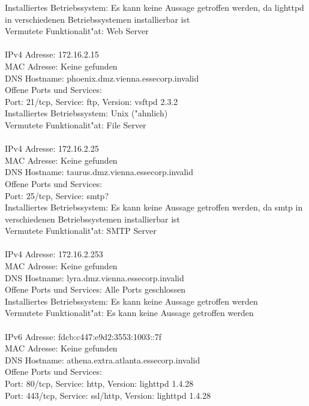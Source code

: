 \documentclass[12pt,a4paper,titlepage,oneside]{scrartcl}
\begin{document}
Installiertes Betriebssystem: Es kann keine Aussage getroffen werden, da lighttpd in verschiedenen Betriebssystemen installierbar ist\\
Vermutete Funktionalit"at: Web Server\\
\\
IPv4 Adresse: 172.16.2.15\\
MAC Adresse: Keine gefunden\\
DNS Hostname: phoenix.dmz.vienna.essecorp.invalid\\
Offene Ports und Services:\\
Port: 21/tcp, Service: ftp, Version: vsftpd 2.3.2\\
Installiertes Betriebssystem: Unix ("ahnlich)\\
Vermutete Funktionalit"at: File Server\\
\\
IPv4 Adresse: 172.16.2.25\\
MAC Adresse: Keine gefunden\\
DNS Hostname: taurus.dmz.vienna.essecorp.invalid\\
Offene Ports und Services:\\
Port: 25/tcp, Service: smtp?\\
Installiertes Betriebssystem: Es kann keine Aussage getroffen werden, da smtp in verschiedenen Betriebssystemen installierbar ist\\
Vermutete Funktionalit"at: SMTP Server\\
\\
IPv4 Adresse: 172.16.2.253\\
MAC Adresse: Keine gefunden\\
DNS Hostname: lyra.dmz.vienna.essecorp.invalid\\
Offene Ports und Services: Alle Ports geschlossen\\
Installiertes Betriebssystem: Es kann keine Aussage getroffen werden\\
Vermutete Funktionalit"at: Es kann keine Aussage getroffen werden\\
\\
IPv6 Adresse: fdcb:c447:e9d2:3553:1003::7f\\
MAC Adresse: Keine gefunden\\
DNS Hostname: athena.extra.atlanta.essecorp.invalid\\
Offene Ports und Services:\\
Port: 80/tcp, Service: http, Version: lighttpd 1.4.28\\
Port: 443/tcp, Service: ssl/http, Version: lighttpd 1.4.28\\
\end{document}
